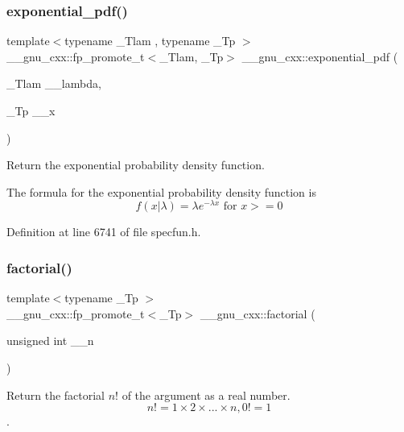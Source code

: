 \subsubsection{\texorpdfstring{exponential\+\_\+pdf()}{exponential\_pdf()}}
{\footnotesize\ttfamily template$<$typename \+\_\+\+Tlam , typename \+\_\+\+Tp $>$ \\
\+\_\+\+\_\+gnu\+\_\+cxx\+::fp\+\_\+promote\+\_\+t$<$\+\_\+\+Tlam, \+\_\+\+Tp$>$ \+\_\+\+\_\+gnu\+\_\+cxx\+::exponential\+\_\+pdf (\begin{DoxyParamCaption}\item[{\+\_\+\+Tlam}]{\+\_\+\+\_\+lambda,  }\item[{\+\_\+\+Tp}]{\+\_\+\+\_\+x }\end{DoxyParamCaption})\hspace{0.3cm}{\ttfamily [inline]}}



Return the exponential probability density function. 

The formula for the exponential probability density function is \[ f(x|\lambda) = \lambda e^{-\lambda x} \mbox{ for } x >= 0 \] 

Definition at line 6741 of file specfun.\+h.

\mbox{\label{group__gnu__math__spec__func_ga963b1612f50b0964f5f42c9f289aab68}} 
\subsubsection{\texorpdfstring{factorial()}{factorial()}}
{\footnotesize\ttfamily template$<$typename \+\_\+\+Tp $>$ \\
\+\_\+\+\_\+gnu\+\_\+cxx\+::fp\+\_\+promote\+\_\+t$<$\+\_\+\+Tp$>$ \+\_\+\+\_\+gnu\+\_\+cxx\+::factorial (\begin{DoxyParamCaption}\item[{unsigned int}]{\+\_\+\+\_\+n }\end{DoxyParamCaption})\hspace{0.3cm}{\ttfamily [inline]}}



Return the factorial $ n! $ of the argument as a real number. \[ n! = 1 \times 2 \times ... \times n, 0! = 1 \]. 



